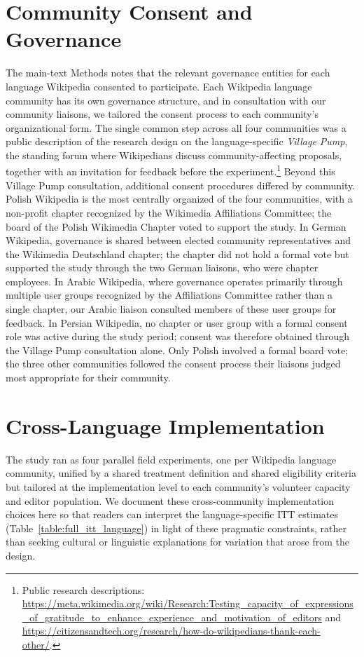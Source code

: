 \documentclass[9pt,twoside,lineno]{pnas-new}
\begin{document}
\section*{Community Consent and Governance}
The main-text Methods notes that the relevant governance entities for each language Wikipedia consented to participate. Each Wikipedia language community has its own governance structure, and in consultation with our community liaisons, we tailored the consent process to each community's organizational form. The single common step across all four communities was a public description of the research design on the language-specific \emph{Village Pump}, the standing forum where Wikipedians discuss community-affecting proposals, together with an invitation for feedback before the experiment.\footnote{Public research descriptions: \url{https://meta.wikimedia.org/wiki/Research:Testing_capacity_of_expressions_of_gratitude_to_enhance_experience_and_motivation_of_editors} and \url{https://citizensandtech.org/research/how-do-wikipedians-thank-each-other/}.} Beyond this Village Pump consultation, additional consent procedures differed by community. Polish Wikipedia is the most centrally organized of the four communities, with a non-profit chapter recognized by the Wikimedia Affiliations Committee; the board of the Polish Wikimedia Chapter voted to support the study. In German Wikipedia, governance is shared between elected community representatives and the Wikimedia Deutschland chapter; the chapter did not hold a formal vote but supported the study through the two German liaisons, who were chapter employees. In Arabic Wikipedia, where governance operates primarily through multiple user groups recognized by the Affiliations Committee rather than a single chapter, our Arabic liaison consulted members of these user groups for feedback. In Persian Wikipedia, no chapter or user group with a formal consent role was active during the study period; consent was therefore obtained through the Village Pump consultation alone. Only Polish involved a formal board vote; the three other communities followed the consent process their liaisons judged most appropriate for their community.


\section*{Cross-Language Implementation}
The study ran as four parallel field experiments, one per Wikipedia language community, unified by a shared treatment definition and shared eligibility criteria but tailored at the implementation level to each community's volunteer capacity and editor population. We document these cross-community implementation choices here so that readers can interpret the language-specific ITT estimates (Table~\ref{table:full_itt_language}) in light of these pragmatic constraints, rather than seeking cultural or linguistic explanations for variation that arose from the design.
\end{document}
